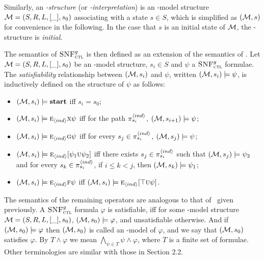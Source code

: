 \documentclass{article}
\begin{document}
Similarly, an {\em \Ind-structure} (or {\em \Ind-interpretation}) is an \Ind-model structure
${\cal M}=(S, R, L, [\_], s_0)$ associating
with a state $s\in S$, which is simplified as $({\cal M},s)$ for convenience in the following.
In the case that $s$ is an initial state of $\cal M$, the \Ind-structure is {\em initial}.

The semantics of ${\textsc{SNF}_{\textsc{ctl}}^g}$ is then
defined as an extension of the semantics of \CTL.
Let ${\cal M}=(S,R,L,[\_],s_0)$ be an \Ind-model structure, $s_i\in S$ and $\psi$ a ${\textsc{SNF}_{\textsc{ctl}}^g}$ formulae.
The {\em satisfiability} relationship between $({\cal M},s_i)$ and $\psi$,
written $({\cal M},s_i)\models\psi$, is inductively defined on the structure of $\psi$ as follows:
\begin{itemize}
  \item $({\cal M},s_i) \models \textbf{start}$ iff $s_i=s_0$;
  \item $({\cal M},s_i)\models \textsc{e}_{{\langle{ind}\rangle}} \textsc{x} \psi$ iff for the path $\pi_{s_i}^{{\langle{ind}\rangle}}$, $({\cal M}, s_{i+1})\models \psi$;
  \item $({\cal M},s_i)\models \textsc{e}_{{\langle{ind}\rangle}}\textsc{g}\psi$ iff
    for every $s_j \in \pi_{s_i}^{{\langle{ind}\rangle}}$,
    $({\cal M},s_j) \models \psi$;
  \item $({\cal M},s_i)\models \textsc{e}_{{\langle{ind}\rangle}}[\psi_1\textsc{u}\psi_2]$ iff
      there exists $s_j\in \pi_{s_i}^{{\langle{ind}\rangle}}$ such that $({\cal M},s_j) \models \psi_2$ and for every $s_k \in \pi_{s_i}^{{\langle{ind}\rangle}}$, if $i\leq k < j$, then $({\cal M},s_k) \models \psi_1$;
  \item $({\cal M},s_i) \models \textsc{e}_{{\langle{ind}\rangle}} \textsc{f} \psi$ iff $({\cal M},s_i) \models \textsc{e}_{{\langle{ind}\rangle}}[\top \textsc{u}\psi]$.
\end{itemize}
The semantics of the remaining operators are analogous to that of \CTL\ given previously.
A ${\textsc{SNF}_{\textsc{ctl}}^g}$ formula $\varphi$ is satisfiable, iff for some \Ind-model structure ${\cal M}=(S,R,L,[\_],s_0)$, $({\cal M},s_0)\models \varphi$, and unsatisfiable otherwise. And if $({\cal M},s_0)\models \varphi$ then $({\cal M},s_0)$ is called an \Ind-model of $\varphi$, and we say that $({\cal M},s_0)$ satisfies $\varphi$.
By $T \wedge \varphi$ we mean $\bigwedge_{\psi\in T} \psi \wedge \varphi$, where $T$ is a finite set of formulae.
Other terminologies are similar with those in Section 2.2.
\end{document}

